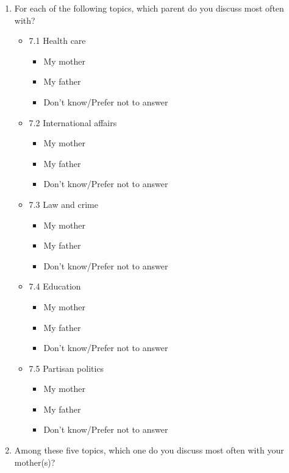 \documentclass[
  letterpaper,
  DIV=11,
  numbers=noendperiod]{scrreprt}
\providecommand{\tightlist}{%
  \setlength{\itemsep}{0pt}\setlength{\parskip}{0pt}}\usepackage{longtable,booktabs,array}
\begin{document}
\begin{enumerate}
\def\labelenumi{\arabic{enumi}.}
\setcounter{enumi}{6}
\item
  For each of the following topics, which parent do you discuss most
  often with?

  \begin{itemize}
  \tightlist
  \item
    7.1 Health care

    \begin{itemize}
    \tightlist
    \item
      My mother
    \item
      My father
    \item
      Don't know/Prefer not to answer
    \end{itemize}
  \item
    7.2 International affairs

    \begin{itemize}
    \tightlist
    \item
      My mother
    \item
      My father
    \item
      Don't know/Prefer not to answer
    \end{itemize}
  \item
    7.3 Law and crime

    \begin{itemize}
    \tightlist
    \item
      My mother
    \item
      My father
    \item
      Don't know/Prefer not to answer
    \end{itemize}
  \item
    7.4 Education

    \begin{itemize}
    \tightlist
    \item
      My mother
    \item
      My father
    \item
      Don't know/Prefer not to answer
    \end{itemize}
  \item
    7.5 Partisan politics

    \begin{itemize}
    \tightlist
    \item
      My mother
    \item
      My father
    \item
      Don't know/Prefer not to answer
    \end{itemize}
  \end{itemize}
\item
  Among these five topics, which one do you discuss most often with your
  mother(s)?
\end{enumerate}
\end{document}
